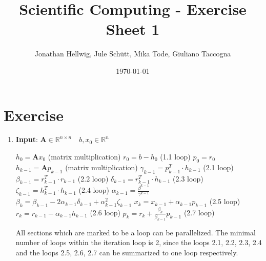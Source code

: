 \documentclass{article}
\title{Scientific Computing - Exercise Sheet 1}
\author{Jonathan Hellwig, Jule Schütt, Mika Tode, Giuliano Taccogna}
\date{\today}
\begin{document}
\maketitle

\section{Exercise}
\begin{enumerate}[label=(\alph*)]
  \item \textbf{Input}: $ \textbf{A} \in \mathbb{R}^{n\times n} \quad b, x_0\in \mathbb{R}^n$
    \begin{algorithmic}[1]
	\State $h_{0} = \textbf{A}x_{0}$ (matrix multiplication)
	\State $r_0 = b - h_0$ (1.1 loop)
	\State $p_0 = r_0$
	\State $h_{k-1} = \textbf{A}p_{k-1}$ (matrix multiplication)
	\State $\gamma_{k-1} = p^{T}_{k-1}\cdot h_{k-1}$ (2.1 loop)
	\State $\beta_{k-1} = r^{T}_{k-1}\cdot r_{k-1}$ (2.2 loop)
	\State $\delta_{k-1} = r^{T}_{k-1}\cdot h_{k-1}$ (2.3 loop)
	\State $\zeta_{k-1} = h^{T}_{k-1}\cdot h_{k-1}$ (2.4 loop)
	\State $\alpha_{k-1} = \frac{\beta^{k-1}}{\gamma^{k-1}}$
	\State $\beta_{k} = \beta_{k-1} - 2 \alpha_{k-1} \delta_{k-1} + \alpha_{k-1}^2\zeta_{k-1}$
	\State $x_k = x_{k-1} + \alpha_{k-1}p_{k-1}$ (2.5 loop)
	\State $r_k = r_{k-1} - \alpha_{k-1}h_{k-1}$ (2.6 loop)
	\State $p_k = r_{k} + \frac{\beta_k}{\beta_{k-1}}p_{k-1}$ (2.7 loop)
	\EndFor
    \end{algorithmic}
All sections which are marked to be a loop can be parallelized. The minimal number of loops within the iteration loop is 2, since the loops
2.1, 2.2, 2.3, 2.4 and the loops 2.5, 2.6, 2.7 can be summarized to one loop respectively.


\end{enumerate}
\end{document}
